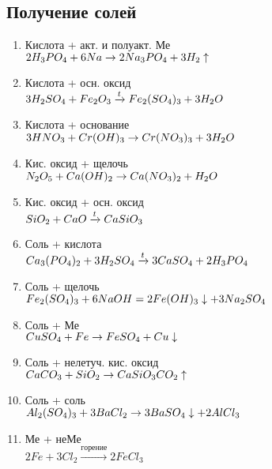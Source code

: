 \subsection{Получение солей}
\begin{enumerate}
    \item Кислота + акт. и полуакт. Ме\\
        $2H_3PO_4 + 6Na \rightarrow 2Na_3PO_4 + 3H_2\uparrow$

    \item Кислота + осн. оксид\\
        $3H_2SO_4 + Fe_2O_3 \xrightarrow{t} Fe_2(SO_4)_3 + 3H_2O$

    \item Кислота + основание\\
        $3HNO_3 + Cr(OH)_3 \rightarrow Cr(NO_3)_3 + 3H_2O$

    \item Кис. оксид + щелочь\\
        $N_2O_5 + Ca(OH)_2 \rightarrow Ca(NO_3)_2 + H_2O$

    \item Кис. оксид + осн. оксид\\
        $SiO_2 + CaO \xrightarrow{t} CaSiO_3$

    \item Соль + кислота\\
        $Ca_3(PO_4)_2 + 3H_2SO_4 \xrightarrow{t} 3CaSO_4 + 2H_3PO_4$

    \item Соль + щелочь\\
        $Fe_2(SO_4)_3 + 6NaOH = 2Fe(OH)_3\downarrow + 3Na_2SO_4$

    \item Соль + Ме\\
        $CuSO_4 + Fe \rightarrow FeSO_4 + Cu\downarrow$

    \item Соль + нелетуч. кис. оксид\\
        $CaCO_3 + SiO_2 \rightarrow CaSiO_3 CO_2\uparrow$

    \item Соль + соль\\
        $Al_2(SO_4)_3 + 3BaCl_2 \rightarrow 3BaSO_4\downarrow + 2AlCl_3$

    \item Ме + неМе\\
        $2Fe + 3Cl_2 \xrightarrow{горение} 2FeCl_3$

\end{enumerate}


